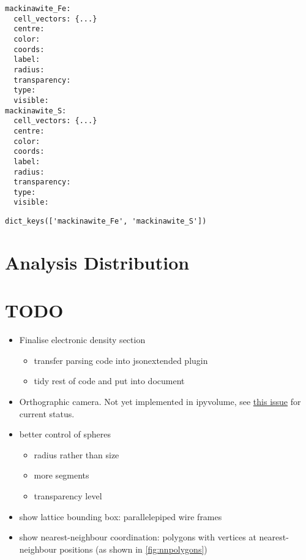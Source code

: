 \documentclass[10pt,parskip=half,
	toc=sectionentrywithdots,
	bibliography=totocnumbered,
	captions=tableheading,numbers=noendperiod]{scrartcl}
\providecommand{\tightlist}{%
  \setlength{\itemsep}{0pt}\setlength{\parskip}{0pt}}
\begin{document}
\begin{lstlisting}[language={},postbreak={},numbers=none,xrightmargin=7pt,belowskip=5pt,aboveskip=5pt,breakindent=0pt]
mackinawite_Fe: 
  cell_vectors: {...}
  centre:       
  color:        
  coords:       
  label:        
  radius:       
  transparency: 
  type:         
  visible:      
mackinawite_S: 
  cell_vectors: {...}
  centre:       
  color:        
  coords:       
  label:        
  radius:       
  transparency: 
  type:         
  visible:      

\end{lstlisting}

\begin{lstlisting}[language={},postbreak={},numbers=none,xrightmargin=7pt,breakindent=0pt,aboveskip=5pt,belowskip=5pt]
dict_keys(['mackinawite_Fe', 'mackinawite_S'])
\end{lstlisting}

\begin{figure}[H]\begin{center}\end{center}
    \end{figure}

\section{Analysis Distribution}\label{analysis-distribution}

\section{TODO}\label{todo}

\begin{itemize}
\tightlist
\item
  Finalise electronic density section

  \begin{itemize}
  \tightlist
  \item
    transfer parsing code into jsonextended plugin
  \item
    tidy rest of code and put into document
  \end{itemize}
\item
  Orthographic camera. Not yet implemented in ipyvolume, see
  \href{https://github.com/maartenbreddels/ipyvolume/issues/31}{this
  issue} for current status.
\item
  better control of spheres

  \begin{itemize}
  \tightlist
  \item
    radius rather than size
  \item
    more segments
  \item
    transparency level
  \end{itemize}
\item
  show lattice bounding box: parallelepiped wire frames
\item
  show nearest-neighbour coordination: polygons with vertices at
  nearest-neighbour positions (as shown in \cref{fig:nnpolygons})
\end{itemize}
\end{document}
